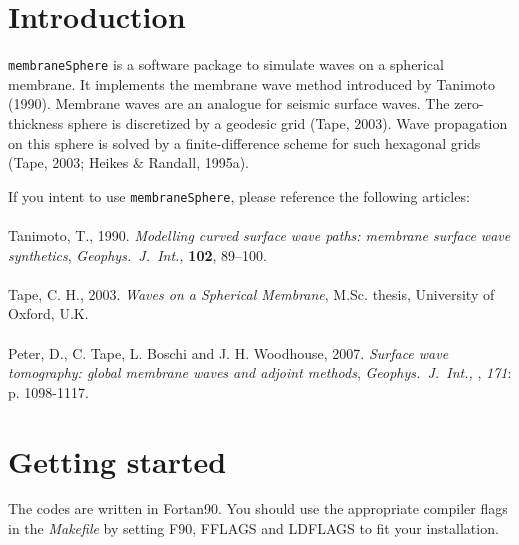 \documentclass[a4paper,
                          headsepline,
                          listof=totoc,
                          toc=listof,
                          headings=small]{scrreprt} %
\newcommand{\gji}{\textit{Geophys.\ J.\ Int.,} }
\begin{document}

\renewcommand{\contentsname}{Table of Contents}
\tableofcontents

\chapter{Introduction}
\texttt{membraneSphere} is a software package to simulate waves on a spherical 
membrane. It implements the membrane wave method introduced by {Tanimoto (1990)}.  
Membrane waves are an analogue for seismic surface waves. The zero-thickness 
sphere is discretized by a geodesic grid ({Tape}, 2003). Wave propagation on 
this sphere is solved by a finite-difference scheme for such 
hexagonal grids (Tape, 2003; {Heikes \& Randall}, 1995a).

If you intent to use \texttt{membraneSphere}, please reference the 
following articles: 
\\
\\
Tanimoto, T., 1990. 
\textit{Modelling curved surface wave paths: membrane surface wave synthetics},
\gji \textbf{102}, 89--100.
\\
\\
Tape, C. H., 2003. 
\textit{Waves on a Spherical Membrane}, 
M.Sc. thesis, University of Oxford, U.K.
\\
\\
Peter, D., C. Tape, L. Boschi and J. H. Woodhouse, 2007. 
\textit{Surface wave tomography: global membrane waves and adjoint methods}, 
\textit{\gji}, \textit{171}: p. 1098-1117.\\

 
\chapter{Getting started}
The codes are written in Fortan90. You should use the appropriate compiler flags
in the \textit{Makefile} by setting \textsf{F90}, \textsf{FFLAGS} and \textsf{LDFLAGS}
to fit your installation.
\end{document}
